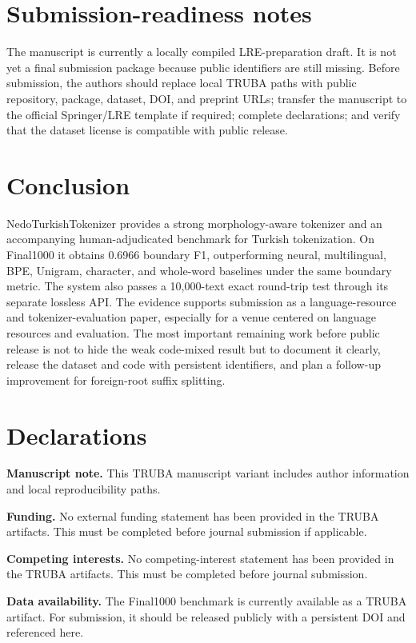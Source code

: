 \documentclass[11pt]{article}
\begin{document}
\section{Submission-readiness notes}
The manuscript is currently a locally compiled LRE-preparation draft. It is not yet a final submission package because public identifiers are still missing. Before submission, the authors should replace local TRUBA paths with public repository, package, dataset, DOI, and preprint URLs; transfer the manuscript to the official Springer/LRE template if required; complete declarations; and verify that the dataset license is compatible with public release.

\section{Conclusion}
NedoTurkishTokenizer provides a strong morphology-aware tokenizer and an accompanying human-adjudicated benchmark for Turkish tokenization. On Final1000 it obtains 0.6966 boundary F1, outperforming neural, multilingual, BPE, Unigram, character, and whole-word baselines under the same boundary metric. The system also passes a 10,000-text exact round-trip test through its separate lossless API. The evidence supports submission as a language-resource and tokenizer-evaluation paper, especially for a venue centered on language resources and evaluation. The most important remaining work before public release is not to hide the weak code-mixed result but to document it clearly, release the dataset and code with persistent identifiers, and plan a follow-up improvement for foreign-root suffix splitting.

\section*{Declarations}
\textbf{Manuscript note.} This TRUBA manuscript variant includes author information and local reproducibility paths.

\textbf{Funding.} No external funding statement has been provided in the TRUBA artifacts. This must be completed before journal submission if applicable.

\textbf{Competing interests.} No competing-interest statement has been provided in the TRUBA artifacts. This must be completed before journal submission.

\textbf{Data availability.} The Final1000 benchmark is currently available as a TRUBA artifact. For submission, it should be released publicly with a persistent DOI and referenced here.
\end{document}
